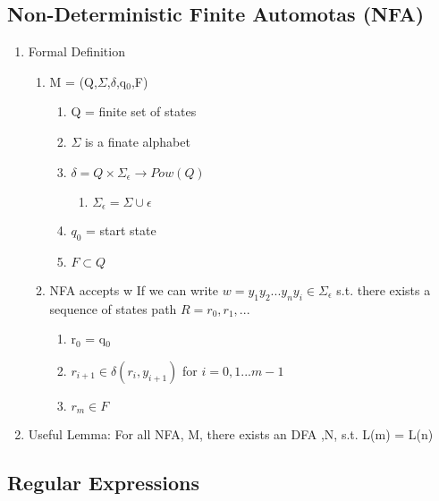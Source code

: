 \documentclass[11pt]{article}
\begin{document}
\subsection{Non-Deterministic Finite Automotas (NFA)}
\label{sec-2.2}

\begin{enumerate}
\item Formal Definition

\begin{enumerate}
\item M = (Q,$\Sigma$,$\delta$,q$_0$,F)

\begin{enumerate}
\item Q = finite set of states
\item $\Sigma$  is a finate alphabet
\item $\delta = Q \times \Sigma_\epsilon \rightarrow Pow(Q)$

\begin{enumerate}
\item $\Sigma_\epsilon = \Sigma \cup {\epsilon}$
\end{enumerate}

\item $q_0$ = start state
\item $F \subset Q$
\end{enumerate}

\item NFA accepts w If we can write $w = {y_1 y_2 ... y_n
         y_i \in \Sigma_\epsilon}$ s.t. there exists a sequence of
         states path $R = {r_0,r_1,...}$

\begin{enumerate}
\item r$_0$ = q$_0$
\item $r_{i+1}\in\delta(r_i,y_{i+1})$ for $i=0,1...m-1$
\item $r_m \in F$
\end{enumerate}

\end{enumerate}

\item Useful Lemma: For all NFA, M, there exists an DFA ,N, s.t. L(m)
      = L(n)
\end{enumerate}
\subsection{Regular Expressions}
\label{sec-2.3}
\end{document}
